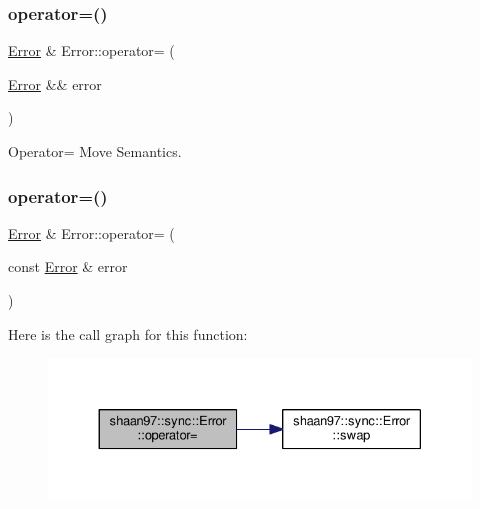 \subsubsection{\texorpdfstring{operator=()}{operator=()}\hspace{0.1cm}{\footnotesize\ttfamily [1/2]}}
{\footnotesize\ttfamily \hyperlink{classshaan97_1_1sync_1_1_error}{Error} \& Error\+::operator= (\begin{DoxyParamCaption}\item[{\hyperlink{classshaan97_1_1sync_1_1_error}{Error} \&\&}]{error }\end{DoxyParamCaption})\hspace{0.3cm}{\ttfamily [virtual]}}



Operator= Move Semantics. 

\mbox{\label{classshaan97_1_1sync_1_1_error_aca9e61b98143dd11af5ddc20e8585641}} 
\subsubsection{\texorpdfstring{operator=()}{operator=()}\hspace{0.1cm}{\footnotesize\ttfamily [2/2]}}
{\footnotesize\ttfamily \hyperlink{classshaan97_1_1sync_1_1_error}{Error} \& Error\+::operator= (\begin{DoxyParamCaption}\item[{const \hyperlink{classshaan97_1_1sync_1_1_error}{Error} \&}]{error }\end{DoxyParamCaption})\hspace{0.3cm}{\ttfamily [virtual]}}

Here is the call graph for this function\+:\nopagebreak
\begin{figure}[H]
\begin{center}
\leavevmode
\includegraphics[width=330pt]{classshaan97_1_1sync_1_1_error_aca9e61b98143dd11af5ddc20e8585641_cgraph}
\end{center}
\end{figure}
\mbox{\label{classshaan97_1_1sync_1_1_error_abd07d5a3c98e8310160b1c13b1b08049}} 
